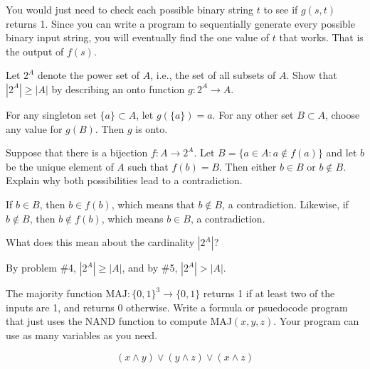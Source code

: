 \documentclass[12pt]{exam}
\begin{document}
\begin{questions}
\begin{solution}
You would just need to check each possible binary string $t$ to see if $g(s,t)$ returns 1.  Since you can write a program to sequentially generate every possible binary input string, you will eventually find the one value of $t$ that works.  That is the output of $f(s)$. 

\end{solution}

\vfill

\newpage
{}

\question Let $2^A$ denote the power set of $A$, i.e., the set of all subsets of $A$. Show that $|2^A| \ge |A|$ by describing an onto function $g:2^A \rightarrow A$. 
\begin{solution}
For any singleton set $\{a\} \subset A$, let $g(\{a\}) = a$. For any other set $B \subset A$, choose any value for $g(B)$.  Then $g$ is onto.
\end{solution}
\vfill

\question Suppose that there is a bijection $f:A \rightarrow 2^A$.  Let $B = \{a \in A : a \notin f(a)\}$ and let $b$ be the unique element of $A$ such that $f(b) = B$.  Then either $b \in B$ or $b \notin B$.  Explain why both possibilities lead to a contradiction.
\begin{solution}
If $b \in B$, then $b \in f(b)$, which means that $b \notin B$, a contradiction.  Likewise, if $b \notin B$, then $b \notin f(b)$, which means $b \in B$, a contradiction.
\end{solution}
\vfill

\question What does this mean about the cardinality $|2^A|$?  
\begin{solution}
By problem \#4, $|2^A| \ge |A|$, and by \#5, $|2^A| > |A|$.  
\end{solution}
\vfill

\question \label{majority} The majority function $\text{MAJ}:\{0,1\}^3 \rightarrow \{0,1\}$ returns 1 if at least two of the inputs are 1, and returns 0 otherwise. Write a formula or psuedocode program that just uses the NAND function to compute MAJ$(x,y,z)$.  Your program can use as many variables as you need.  %
\begin{solution}
$$(x \wedge y) \vee (y \wedge z) \vee (x \wedge z)$$
\end{solution}
\vfill


\end{questions}
\end{document}
